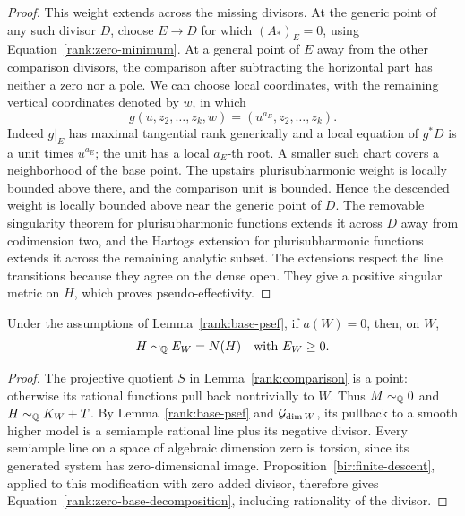 \begin{proof}
This weight extends across the missing divisors.  At the generic
point of any such divisor \(D\), choose \(E\to D\) for which
\((A_*)_E=0\), using Equation~\eqref{rank:zero-minimum}.
At a general point of \(E\) away from the other comparison divisors,
the comparison after subtracting the horizontal part has neither
a zero nor a pole.  We can choose local coordinates, with the remaining
vertical coordinates denoted by \(w\), in which
\[
 g(u,z_2,\ldots,z_k,w)=(u^{a_E},z_2,\ldots,z_k).
\]
Indeed \(g|_E\) has maximal tangential rank generically and a local
equation of \(g^*D\) is a unit times \(u^{a_E}\); the unit has a
local \(a_E\)-th root.  A smaller such chart covers a neighborhood
of the base point.  The upstairs plurisubharmonic weight is locally
bounded above there, and the comparison unit is bounded.  Hence
the descended weight is locally bounded above near the generic
point of \(D\).  The removable singularity theorem for
plurisubharmonic functions extends it across \(D\) away from
codimension two, and the Hartogs extension for plurisubharmonic
functions extends it across the remaining analytic subset.
The extensions respect the line transitions because they agree on
the dense open.  They give a positive singular metric on \(H\),
which proves pseudo-effectivity.
\end{proof}

\begin{lemma}
\label{rank:zero-base}
Under the assumptions of Lemma~\ref{rank:base-psef}, if \(a(W)=0\),
then, on \(W\),
\begin{equation}
                        H\sim_{\mathbb Q}E_W=N(H)
                        \quad\text{with }E_W\geq0.
\label{rank:zero-base-decomposition}
\end{equation}
\end{lemma}

\begin{proof}
The projective quotient \(S\) in Lemma~\ref{rank:comparison} is a
point: otherwise its rational functions pull back nontrivially to
\(W\).  Thus \(M\sim_{\mathbb Q}0\) and \(H\sim_{\mathbb Q}K_W+T\).
By Lemma~\ref{rank:base-psef} and \(\mathcal G_{\dim W}\), its pullback
to a smooth higher model is a semiample rational line plus its
negative divisor.  Every semiample line on a space of algebraic
dimension zero is torsion, since its generated system has
zero-dimensional image.  Proposition~\ref{bir:finite-descent}, applied
to this modification with zero added divisor, therefore gives
Equation~\eqref{rank:zero-base-decomposition}, including rationality
of the divisor.
\end{proof}


